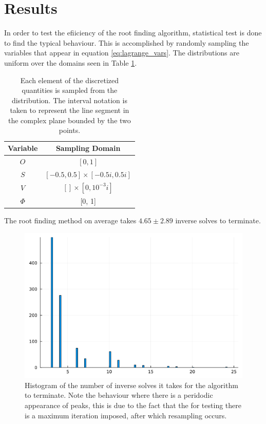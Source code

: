 \documentclass[reprint]{revtex4-2}
\begin{document}
\section{Results}
\label{sec:results}
In order to test the efiiciency of the root finding algorithm, statistical test is done to find the typical behaviour. This is accomplished by randomly sampling the variables that appear in equation \ref{eq:lagrange_vars}. The distributions are uniform over the domains seen in Table \ref{tab:domains}.

\begin{table}[!htp]
\begin{tabular}{|c|c|}
\hline
Variable & Sampling Domain                   \\ \hline
$O$      & $[0, 1]$ \\ \hline
$S$      & $[-0.5, 0.5]\times[-0.5i, 0.5i]$  \\ \hline
$V$      & $[]\times[0, 10^{-3}i]$  \\ \hline
$\Phi$   & [0, 1]                            \\ \hline
\end{tabular}
\caption{Each element of the discretized quantities is sampled from the distribution. The interval notation is taken to represent the line segment in the complex plane bounded by the two points.}
\label{tab:domains}
\end{table}

The root finding method on average takes $4.65\pm 2.89$ inverse solves to terminate.

\begin{figure}[!htp]
	\includegraphics[width=\linewidth]{histogram.png}
	\caption{Histogram of the number of inverse solves it takes for the algorithm to terminate. Note the behaviour where there is a peridodic appearance of peaks, this is due to the fact that the for testing there is a maximum iteration imposed, after which resampling occurs.}
\end{figure}


\end{document}
